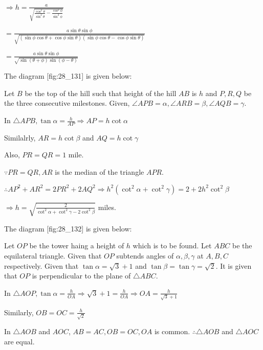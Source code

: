   $\Rightarrow h = \frac{a}{\sqrt{\frac{\cos^2\theta}{\sin^2\theta} -
      \frac{\cos^2\phi}{\sin^2\phi}}}$

  $= \frac{a\sin\theta\sin\phi}{\sqrt{(\sin\phi\cos\theta +
      \cos\phi\sin\theta)(\sin\phi\cos\theta - \cos\phi\sin\theta)}}$

  $= \frac{a\sin\theta\sin\phi}{\sqrt{\sin(\theta + \phi)\sin(\phi - \theta)}}$

\item The diagram [fig:28_131] is given below:

  \startplacefigure[reference=fig:28_131]
    \externalfigure[28_131.pdf]
  \stopplacefigure

  Let $B$ be the top of the hill such that height of the hill $AB$ is $h$ and $P,
  R, Q$ be the three consecutive milestones. Given, $\angle APB = \alpha, \angle ARB = \beta,
  \angle AQB = \gamma$.

  In $\triangle APB, \tan\alpha = \frac{h}{AP}\Rightarrow AP = h\cot\alpha$

  Similalrly, $AR = h\cot\beta$ and $AQ = h\cot\gamma$

  Also, $PR = QR = 1$ mile.

  $\because PR = QR, AR$ is the median of the triangle $APR$.

  $\therefore AP^2 + AR^2 = 2PR^2 + 2AQ^2 \Rightarrow h^2(\cot^2\alpha + \cot^2\gamma) = 2 +
  2h^2\cot^2\beta$

  $\Rightarrow h = \sqrt{\frac{2}{\cot^2\alpha + \cot^2\gamma - 2\cot^2\beta}}$ miles.

\item The diagram [fig:28_132] is given below:

  \startplacefigure[reference=fig:28_132]
    \externalfigure[28_132.pdf]
  \stopplacefigure

  Let $OP$ be the tower haing a height of $h$ which is to be found. Let $ABC$ be the
  equilateral triangle. Given that $OP$ subtends angles of $\alpha, \beta, \gamma$ at
  $A, B, C$ respectively. Given that $\tan\alpha = \sqrt{3} + 1$ and $\tan\beta =
  \tan\gamma = \sqrt{2}$. It is given that $OP$ is perpendicular to the plane of $\triangle
  ABC$.

  In $\triangle AOP, \tan\alpha = \frac{h}{OA} \Rightarrow \sqrt{3} + 1 = \frac{h}{OA} \Rightarrow
  OA = \frac{h}{\sqrt{3} + 1}$

  Similarly, $OB = OC = \frac{h}{\sqrt{2}}$

  In $\triangle AOB$ and $AOC$, $AB = AC, OB = OC, OA$ is common. $\therefore
  \triangle AOB$ and $\triangle AOC$ are equal.


